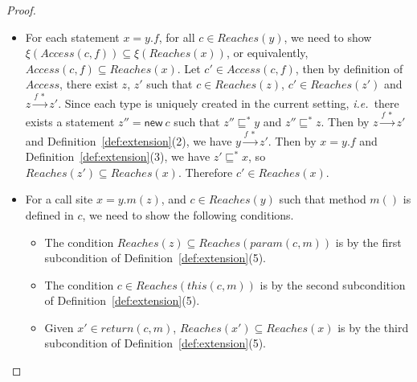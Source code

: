 \documentclass{fac}
\newcommand\ie{\textit{i.e.\ }}
\newcommand{\keyword}[1]{\mathsf{#1}}
\newcommand{\kwnew}[0]{\keyword{new}}
\newcommand{\less}{\sqsubseteq}
\newcommand{\hflow}{\longrightarrow}
\newcommand{\lhflow}[1]{\stackrel{#1}{\hflow}}
\begin{document}
\begin{proof}
\begin{itemize}
\item For each statement $x = y.f$, for all $c\in Reaches(y)$, we need to show $\xi(Access(c,f))\subseteq\xi(Reaches(x))$, or equivalently, $Access(c,f)\subseteq Reaches(x)$. Let $c'\in Access(c,f)$, then by definition of $Access$, there exist $z$, $z'$ such that $c\in Reaches(z)$, $c'\in Reaches(z')$ and $z\lhflow{f\ *}z'$.
    Since each type is uniquely created in the current setting, \ie there exists a statement $z''= \kwnew\ c$ such that $z''\less^* y$ and $z''\less^* z$. Then by $z\lhflow{f\ *}z'$ and Definition~\ref{def:extension}(2), we have $y\lhflow{f\ *}z'$. Then by $x = y.f$ and Definition~\ref{def:extension}(3), we have $z'\less^*x$, so $Reaches(z')\subseteq Reaches(x)$. Therefore $c'\in Reaches(x)$.

\item For a call site $x = y.m(z)$, and $c\in Reaches(y)$ such that method $m()$ is defined in $c$, we need to show the following conditions.
      \begin{itemize}
      \item The condition $Reaches(z)\subseteq Reaches(param(c,m))$ is by the first subcondition of Definition~\ref{def:extension}(5).
      \item The condition $c\in Reaches(this(c,m))$ is by the second subcondition of Definition~\ref{def:extension}(5).
      \item Given $x'\in return(c,m)$, $Reaches(x')\subseteq Reaches(x)$ is by the third subcondition of Definition~\ref{def:extension}(5).
      \end{itemize}
\end{itemize}

\medskip


\end{proof}
\end{document}
